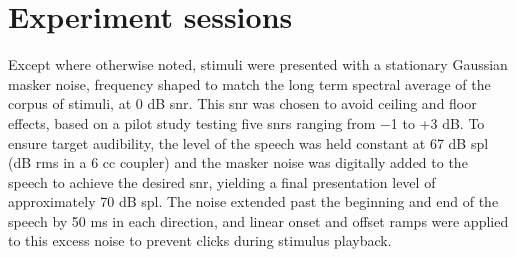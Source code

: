 \section{Experiment sessions}

Except where otherwise noted, stimuli were presented with a stationary Gaussian masker noise, frequency shaped to match the long term spectral average of the corpus of stimuli, at 0 dB \ac{snr}.  This \ac{snr} was chosen to avoid ceiling and floor effects, based on a pilot study testing five \ac{snr}s ranging from −1 to +3 dB.  To ensure target audibility, the level of the speech was held constant at 67 dB \ac{spl} (dB \ac{rms} in a 6 cc coupler) and the masker noise was digitally added to the speech to achieve the desired \ac{snr}, yielding a final presentation level of approximately 70 dB \ac{spl}.  The noise extended past the beginning and end of the speech by 50 ms in each direction, and linear onset and offset ramps were applied to this excess noise to prevent clicks during stimulus playback.

